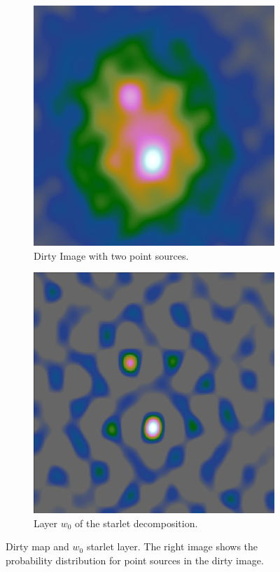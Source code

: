 \begin{figure}[h]
	\centering
	\begin{subfigure}[b]{0.25\linewidth}
		\includegraphics[width=\linewidth]{./chapters/05.algorithms/starlets/dirty2.png}
		\caption{Dirty Image with two point sources.}
		\label{cd:heuristic:dirty}
	\end{subfigure}
	\begin{subfigure}[b]{0.25\linewidth}
		\includegraphics[width=\linewidth]{./chapters/05.algorithms/starlets/starlet0_2.png}
		\caption{Layer $w_0$ of the starlet decomposition.}
		\label{cd:heuristic:starlet}
	\end{subfigure}
	\caption{Dirty map and $w_0$ starlet layer. The right image shows the probability distribution for point sources in the dirty image.}
	\label{cd:heuristic:figure}
\end{figure}


